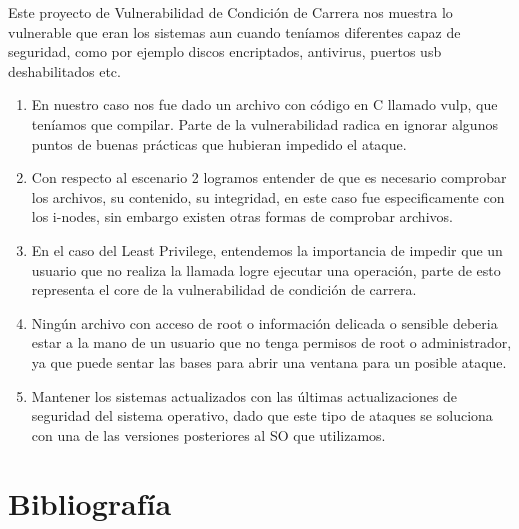 \documentclass{article}
\begin{document}
Este proyecto de Vulnerabilidad de Condición de Carrera nos muestra lo vulnerable que eran los sistemas aun cuando teníamos diferentes capaz de seguridad, como por ejemplo discos encriptados, antivirus, puertos usb deshabilitados etc.

\begin{enumerate}
    \item En nuestro caso nos fue dado un archivo con código en C llamado vulp, que teníamos que compilar. Parte de la vulnerabilidad radica en ignorar algunos puntos de buenas prácticas que hubieran impedido el ataque. 
    
    \item Con respecto al escenario 2 logramos entender de que es necesario comprobar los archivos, su contenido, su integridad, en este caso fue especificamente con los i-nodes, sin embargo existen otras formas de comprobar archivos.
    
    \item En el caso del Least Privilege, entendemos la importancia de impedir que un usuario que no realiza la llamada logre ejecutar una operación, parte de esto representa el core de la vulnerabilidad de condición de carrera.
    
    \item Ningún archivo con acceso de root o información delicada o sensible deberia estar a la mano de un usuario que no tenga permisos de root o administrador, ya que puede sentar las bases para abrir una ventana para un posible ataque.
    
    \item Mantener los sistemas actualizados con las últimas actualizaciones de seguridad del sistema operativo, dado que este tipo de ataques se soluciona con una de las versiones posteriores al SO que utilizamos.
    
\end{enumerate}

\section*{Bibliografía}
\end{document}
